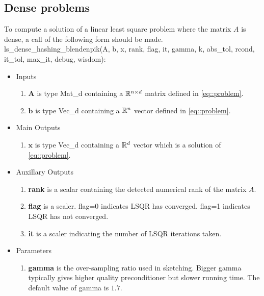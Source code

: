 \documentclass[english,11pt]{article}
\begin{document}
\subsection{Dense problems}

To compute a solution of a linear least square problem where the matrix $A$ is dense, a call of the following form should be made. \\

ls_dense_hashing_blendenpik(A, b, x, rank, flag, it, gamma, k, abs_tol, rcond, it_tol, max_it, debug, wisdom):
	\begin{itemize}
	\setlength\itemsep{-0.5em}
	\item Inputs 
		\begin{enumerate}
			\item $\mathbf A$ is type Mat_d containing a $\mathbb{R}^{n \times d}$ matrix defined in \eqref{eq::problem}.
			\item $\mathbf b$ is type Vec_d containing a $\mathbb{R}^n$ vector defined in \eqref{eq::problem}.
		\end{enumerate}
	
	\item Main Outputs
		\begin{enumerate}
			\item { $\mathbf x$} is type Vec_d containing a $\mathbb{R}^d$ vector which is a solution of \eqref{eq::problem}.
		\end{enumerate}

	\item Auxillary Outputs
		\begin{enumerate}
			\item {\bf rank} is a scalar containing the detected numerical rank of the matrix $A$. 
			\item {\bf flag} is a scaler. flag=0 indicates LSQR has converged. flag=1 indicates LSQR has not converged. 
			\item {\bf it} is a scaler indicating the number of LSQR iterations taken. 
		\end{enumerate}
		

	\item Parameters
		\begin{enumerate}
			\item {\bf gamma} is the over-sampling ratio used in sketching. Bigger gamma typically gives higher quality preconditioner but slower running time. The default value of gamma is $1.7$.


\end{enumerate}
\end{itemize}
\end{document}
